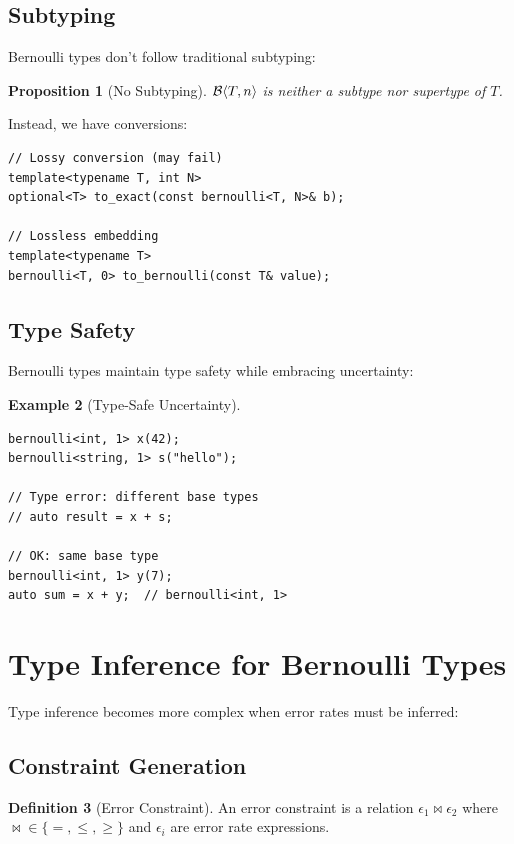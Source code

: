 \documentclass[11pt,twoside,openright]{book}
\theoremstyle{definition}
\newtheorem{definition}{Definition}[chapter]
\newtheorem{example}[definition]{Example}
\theoremstyle{plain}
\newtheorem{proposition}[definition]{Proposition}
\theoremstyle{remark}
\begin{document}
\subsection{Subtyping}

Bernoulli types don't follow traditional subtyping:

\begin{proposition}[No Subtyping]
$\mathcal{B}\langle T, n \rangle$ is neither a subtype nor supertype of $T$.
\end{proposition}

Instead, we have conversions:
\begin{verbatim}
// Lossy conversion (may fail)
template<typename T, int N>
optional<T> to_exact(const bernoulli<T, N>& b);

// Lossless embedding
template<typename T>
bernoulli<T, 0> to_bernoulli(const T& value);
\end{verbatim}

\subsection{Type Safety}

Bernoulli types maintain type safety while embracing uncertainty:

\begin{example}[Type-Safe Uncertainty]
\begin{verbatim}
bernoulli<int, 1> x(42);
bernoulli<string, 1> s("hello");

// Type error: different base types
// auto result = x + s;  

// OK: same base type
bernoulli<int, 1> y(7);
auto sum = x + y;  // bernoulli<int, 1>
\end{verbatim}
\end{example}

\section{Type Inference for Bernoulli Types}

Type inference becomes more complex when error rates must be inferred:

\subsection{Constraint Generation}

\begin{definition}[Error Constraint]
An error constraint is a relation $\epsilon_1 \bowtie \epsilon_2$ where $\bowtie \in \{=, \leq, \geq\}$ and $\epsilon_i$ are error rate expressions.
\end{definition}
\end{document}
